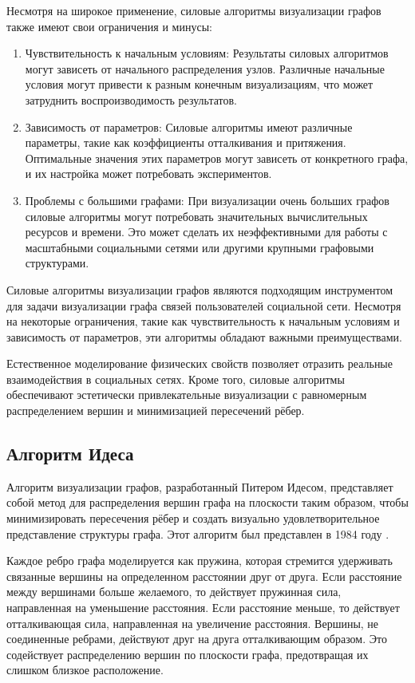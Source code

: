 \documentclass[14pt, russian]{scrartcl}
\begin{document}
Несмотря на  широкое применение, силовые алгоритмы визуализации графов также имеют свои ограничения и минусы:

\begin{enumerate}
	\item{Чувствительность к начальным условиям: Результаты силовых алгоритмов могут зависеть от начального распределения узлов. Различные начальные условия могут привести к разным конечным визуализациям, что может затруднить воспроизводимость результатов.}
	\item{Зависимость от параметров: Силовые алгоритмы имеют различные параметры, такие как коэффициенты отталкивания и притяжения. Оптимальные значения этих параметров могут зависеть от конкретного графа, и их настройка может потребовать экспериментов.}
	\item{Проблемы с большими графами:
	      При визуализации очень больших графов силовые алгоритмы могут потребовать значительных вычислительных ресурсов и времени. Это может сделать их неэффективными для работы с масштабными социальными сетями или другими крупными графовыми структурами.}
\end{enumerate}

Силовые алгоритмы визуализации графов являются подходящим инструментом для задачи визуализации графа связей пользователей социальной сети. Несмотря на некоторые ограничения, такие как чувствительность к начальным условиям и зависимость от параметров, эти алгоритмы обладают важными преимуществами.

Естественное моделирование физических свойств позволяет отразить реальные взаимодействия в социальных сетях. Кроме того, силовые алгоритмы обеспечивают эстетически привлекательные визуализации с равномерным распределением вершин и минимизацией пересечений рёбер.



\subsection{Алгоритм Идеса}

Алгоритм визуализации графов, разработанный Питером Идесом, представляет собой метод для распределения вершин графа на плоскости таким образом, чтобы минимизировать пересечения рёбер и создать визуально удовлетворительное представление структуры графа. Этот алгоритм был представлен в 1984 году \cite{Eades}.

Каждое ребро графа моделируется как пружина, которая стремится удерживать связанные вершины на определенном расстоянии друг от друга. Если расстояние между вершинами больше желаемого, то действует пружинная сила, направленная на уменьшение расстояния. Если расстояние меньше, то действует отталкивающая сила, направленная на увеличение расстояния. Вершины, не соединенные ребрами, действуют друг на друга отталкивающим образом. Это содействует распределению вершин по плоскости графа, предотвращая их слишком близкое расположение.
\end{document}
